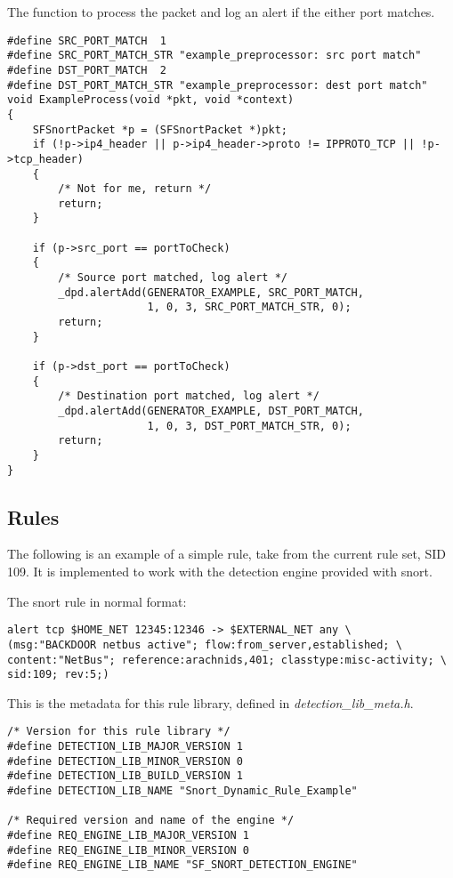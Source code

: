 \documentclass[english]{report}
\begin{document}
The function to process the packet and log an alert if the either port
matches.

\begin{verbatim}
#define SRC_PORT_MATCH  1
#define SRC_PORT_MATCH_STR "example_preprocessor: src port match"
#define DST_PORT_MATCH  2
#define DST_PORT_MATCH_STR "example_preprocessor: dest port match"
void ExampleProcess(void *pkt, void *context)
{
    SFSnortPacket *p = (SFSnortPacket *)pkt;
    if (!p->ip4_header || p->ip4_header->proto != IPPROTO_TCP || !p->tcp_header)
    {
        /* Not for me, return */
        return;
    }

    if (p->src_port == portToCheck)
    {
        /* Source port matched, log alert */
        _dpd.alertAdd(GENERATOR_EXAMPLE, SRC_PORT_MATCH,
                      1, 0, 3, SRC_PORT_MATCH_STR, 0);
        return;
    }

    if (p->dst_port == portToCheck)
    {
        /* Destination port matched, log alert */
        _dpd.alertAdd(GENERATOR_EXAMPLE, DST_PORT_MATCH,
                      1, 0, 3, DST_PORT_MATCH_STR, 0);
        return;
    }
}
\end{verbatim}

\subsection{Rules}

The following is an example of a simple rule, take from the current
rule set, SID 109.  It is implemented to work with the detection engine
provided with snort.

The snort rule in normal format:

\begin{verbatim}
alert tcp $HOME_NET 12345:12346 -> $EXTERNAL_NET any \
(msg:"BACKDOOR netbus active"; flow:from_server,established; \
content:"NetBus"; reference:arachnids,401; classtype:misc-activity; \
sid:109; rev:5;)
\end{verbatim}

This is the metadata for this rule library, defined in
{\em detection\_lib\_meta.h}.

\begin{verbatim}
/* Version for this rule library */
#define DETECTION_LIB_MAJOR_VERSION 1
#define DETECTION_LIB_MINOR_VERSION 0
#define DETECTION_LIB_BUILD_VERSION 1
#define DETECTION_LIB_NAME "Snort_Dynamic_Rule_Example"

/* Required version and name of the engine */
#define REQ_ENGINE_LIB_MAJOR_VERSION 1
#define REQ_ENGINE_LIB_MINOR_VERSION 0
#define REQ_ENGINE_LIB_NAME "SF_SNORT_DETECTION_ENGINE"

\end{verbatim}
\end{document}
